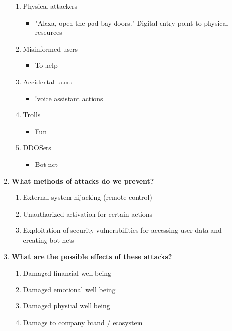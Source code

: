 \documentclass[letterpaper]{article}
\begin{document}
\begin{enumerate}
\begin{enumerate}
\item Physical attackers

\begin{itemize}
\item "Alexa, open the pod bay doors." Digital entry point to physical
resources
\end{itemize}

\item Misinformed users

\begin{itemize}
\item To help
\end{itemize}

\item Accidental users

\begin{itemize}
\item !voice assistant actions
\end{itemize}

\item Trolls

\begin{itemize}
\item Fun
\end{itemize}

\item DDOSers

\begin{itemize}
\item Bot net
\end{itemize}
\end{enumerate}

\item \textbf{What methods of attacks do we prevent?}

\begin{enumerate}
\item External system hijacking (remote control)
\item Unauthorized activation for certain actions
\item Exploitation of security vulnerabilities for accessing user data
and creating bot nets
\end{enumerate}

\item \textbf{What are the possible effects of these attacks?}

\begin{enumerate}
\item Damaged financial well being
\item Damaged emotional well being
\item Damaged physical well being
\item Damage to company brand / ecosystem
\end{enumerate}


\end{enumerate}
\end{document}
